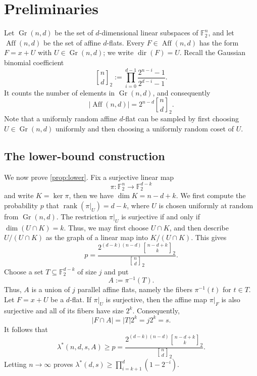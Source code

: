 \documentclass[reqno]{amsart}
\theoremstyle{definition}
\theoremstyle{remark}
\newcommand{\F}{\mathbb F}
\renewcommand{\P}{\mathbb P}
\newcommand{\qbinom}[2]{\genfrac{[}{]}{0pt}{}{#1}{#2}_{\!2}}
\DeclareMathOperator{\Aff}{Aff}
\DeclareMathOperator{\Gr}{Gr}
\DeclareMathOperator{\dir}{dir}
\DeclareMathOperator{\rank}{rank}
\begin{document}
\section{Preliminaries}\label{sec:prelim}

Let $\Gr(n,d)$ be the set of $d$-dimensional linear subspaces of
$\F_2^n$, and let $\Aff(n,d)$ be the set of affine $d$-flats. Every
$F\in\Aff(n,d)$ has the form $F=x+U$ with $U\in\Gr(n,d)$; we write
$\dir(F)=U$. Recall the Gaussian binomial coefficient
\[
  \qbinom{n}{d}
  :=\prod_{i=0}^{d-1}\frac{2^{n-i}-1}{2^{d-i}-1}.
\]
It counts the number of elements in $\Gr(n,d)$, and consequently
\[
  |\Aff(n,d)|=2^{n-d}\qbinom{n}{d}.
\]
Note that a uniformly random affine $d$-flat can be sampled by first choosing
$U\in\Gr(n,d)$ uniformly and then choosing a uniformly random coset of
$U$.


\subsection{The lower-bound construction}

We now prove \cref{prop:lower}.
Fix a surjective linear map
\[
  \pi:\F_2^n\longrightarrow\F_2^{d-k}
\]
and write $K=\ker \pi$, then we have $\dim K=n-d+k$. We first compute the probability $p$ that $\rank(\pi|_U)=d-k$, where $U$ is chosen uniformly at random from $\Gr(n,d)$. The restriction $\pi|_U$ is surjective if and only if $\dim(U\cap K)=k$. Thus, we may first choose
$U\cap K$, and then describe $U/(U\cap K)$ as the graph of a linear
map into $K/(U\cap K)$. This gives
\begin{equation}\label{eq:finite-rank-probability}
  p
  =\frac{2^{(d-k)(n-d)}\qbinom{n-d+k}{k}}{\qbinom{n}{d}}.
\end{equation}
Choose a set $T\subseteq\F_2^{d-k}$ of size $j$ and put
\[
  A:=\pi^{-1}(T).
\]
Thus, $A$ is a union of $j$ parallel affine flats, namely the fibers
$\pi^{-1}(t)$ for $t\in T$.  Let
$F=x+U$ be a $d$-flat. If $\pi|_U$ is surjective, then the affine map
$\pi|_F$ is also surjective and all of its fibers have size $2^k$.
Consequently,
\[
  |F\cap A|=|T|2^k=j2^k=s.
\]
It follows that
\[\lambda^*(n,d,s,A)\ge p
  =\frac{2^{(d-k)(n-d)}\qbinom{n-d+k}{k}}{\qbinom{n}{d}}.\]  
Letting $n\to\infty$ proves $\lambda^*(d,s)\ge \prod_{i = k+1}^d(1-2^{-i})$.
\end{document}
